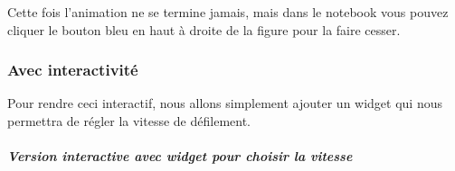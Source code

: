     
    Cette fois l'animation ne se termine jamais, mais dans le notebook vous
pouvez cliquer le bouton bleu en haut à droite de la figure pour la
faire cesser.

    \hypertarget{avec-interactivituxe9}{%
\subsubsection{Avec interactivité}\label{avec-interactivituxe9}}

    Pour rendre ceci interactif, nous allons simplement ajouter un widget
qui nous permettra de régler la vitesse de défilement.

    \hypertarget{version-interactive-avec-widget-pour-choisir-la-vitesse}{%
\subparagraph{Version interactive avec widget pour choisir la
vitesse}\label{version-interactive-avec-widget-pour-choisir-la-vitesse}}

